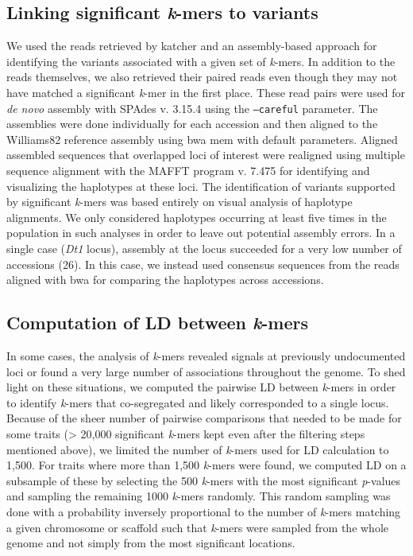 \subsection*{Linking significant \emph{k}-mers to variants}
\label{sv-gwas-methods-linking-kmers}

We used the reads retrieved by katcher and an assembly-based approach for
identifying the variants associated with a given set of \emph{k}-mers. In
addition to the reads themselves, we also retrieved their paired reads even
though they may not have matched a significant \emph{k}-mer in the first place.
These read pairs were used for \emph{de novo} assembly with SPAdes v. 3.15.4
\citep{spades} using the \texttt{--careful} parameter. The assemblies were done
individually for each accession and then aligned to the Williams82 reference
assembly using bwa mem with default parameters.  Aligned assembled sequences
that overlapped loci of interest were realigned using multiple sequence
alignment with the MAFFT program v. 7.475 \citep{katoh2002} for identifying and
visualizing the haplotypes at these loci. The identification of variants
supported by significant \textit{k}-mers was based entirely on visual analysis
of haplotype alignments. We only considered haplotypes occurring at least five
times in the population in such analyses in order to leave out potential
assembly errors. In a single case (\emph{Dt1} locus), assembly at the locus
succeeded for a very low number of accessions (26). In this case, we instead used
consensus sequences from the reads aligned with bwa for comparing the
haplotypes across accessions. 

\subsection*{Computation of LD between \emph{k}-mers}
\label{sv-gwas-ld-kmers}

In some cases, the analysis of \emph{k}-mers revealed signals at previously
undocumented loci or found a very large number of associations throughout the
genome. To shed light on these situations, we computed the pairwise LD between
\emph{k}-mers in order to identify \emph{k}-mers that co-segregated and
likely corresponded to a single locus. Because of the sheer number of pairwise
comparisons that needed to be made for some traits (> 20,000 significant
\emph{k}-mers kept even after the filtering steps mentioned above), we limited
the number of \emph{k}-mers used for LD calculation to 1,500. For traits where
more than 1,500 \emph{k}-mers were found, we computed LD on a subsample of
these by selecting the 500 \emph{k}-mers with the most significant
\emph{p}-values and sampling the remaining 1000 \emph{k}-mers randomly. This
random sampling was done with a probability inversely proportional to the
number of \emph{k}-mers matching a given chromosome or scaffold such that
\emph{k}-mers were sampled from the whole genome and not simply from the most
significant locations.

